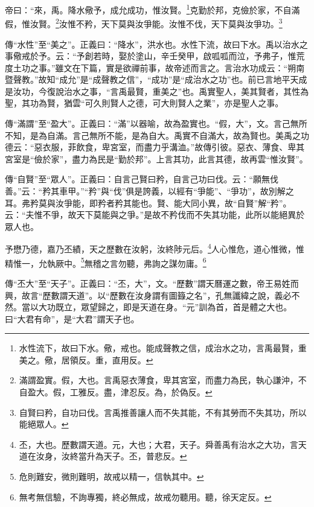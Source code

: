 帝曰：“來，禹。降水儆予，成允成功，惟汝賢。\footnote{水性流下，故曰下水。儆，戒也。能成聲教之信，成治水之功，言禹最賢，重美之。儆，居領反。重，直用反。}克勤於邦，克儉於家，不自滿假，惟汝賢。\footnote{滿謂盈實。假，大也。言禹惡衣薄食，卑其宮室，而盡力為民，執心謙沖，不自盈大。假，工雅反。盡，津忍反。為，於偽反。}汝惟不矜，天下莫與汝爭能。汝惟不伐，天下莫與汝爭功。\footnote{自賢曰矜，自功曰伐。言禹推善讓人而不失其能，不有其勞而不失其功，所以能絕眾人。}

{\noindent\zhuan{}\fzbyks 傳“水性”至“美之”。正義曰：“降水”，洪水也。水性下流，故曰下水。禹以治水之事儆戒於予。云：“予創若時，娶於塗山，辛壬癸甲，啟呱呱而泣，予弗子，惟荒度土功之事。”雖文在下篇，實是欲禪前事，故帝述而言之。言治水功成云：“朔南暨聲教。”故知“成允”是“成聲教之信”，“成功”是“成治水之功”也。前已言地平天成是汝功，今復說治水之事，“言禹最賢，重美之”也。禹實聖人，美其賢者，其性為聖，其功為賢，猶雲“可久則賢人之德，可大則賢人之業”，亦是聖人之事。 \par}

{\noindent\zhuan{}\fzbyks 傳“滿謂”至“盈大”。正義曰：“滿”以器喻，故為盈實也。“假，大”，文。言己無所不知，是為自滿。言己無所不能，是為自大。禹實不自滿大，故為賢也。美禹之功德云：“惡衣服，菲飲食，卑宮室，而盡力乎溝洫。”故傳引彼。惡衣、薄食、卑其宮室是“儉於家”，盡力為民是“勤於邦”。上言其功，此言其德，故再雲“惟汝賢”。 \par}

{\noindent\zhuan{}\fzbyks 傳“自賢”至“眾人”。正義曰：自言己賢曰矜，自言己功曰伐。云：“願無伐善。”云：“矜其車甲。”“矜”與“伐”俱是誇義，以經有“爭能”、“爭功”，故別解之耳。弗矜莫與汝爭能，即矜者矜其能也。賢、能大同小異，故“自賢”解“矜”。云：“夫惟不爭，故天下莫能與之爭。”是故不矜伐而不失其功能，此所以能絕異於眾人也。 \par}

予懋乃德，嘉乃丕績，天之歷數在汝躬，汝終陟元后。\footnote{丕，大也。歷數謂天道。元，大也；大君，天子。舜善禹有治水之大功，言天道在汝身，汝終當升為天子。丕，普悲反。}人心惟危，道心惟微，惟精惟一，允執厥中。\footnote{危則難安，微則難明，故戒以精一，信執其中。}無稽之言勿聽，弗詢之謀勿庸。\footnote{無考無信驗，不詢專獨，終必無成，故戒勿聽用。聽，徐天定反。}

{\noindent\zhuan{}\fzbyks 傳“丕大”至“天子”。正義曰：“丕，大”，文。“歷數”謂天曆運之數，帝王易姓而興，故言“歷數謂天道”。以“歷數在汝身謂有圖籙之名”，孔無讖緯之說，義必不然。當以大功既立，眾望歸之，即是天道在身。“元”訓為首，首是體之大也。曰“大君有命”，是“大君”謂天子也。 \par}

